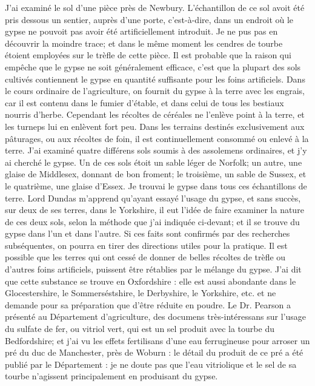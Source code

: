 \setcounter{page}{237} J'ai examiné le sol d'une pièce près de Newbury. L'échantillon de ce sol avoit été pris dessous un sentier, auprès d'une porte, c'est-à-dire, dans un endroit où le gypse ne pouvoit pas avoir été artificiellement introduit. Je ne pus pas en découvrir la moindre trace; et dans le même moment les cendres de tourbe étoient employées sur le trèfle de cette pièce. Il est probable que la raison qui empêche que le gypse ne soit généralement efficace, c'est que la plupart des sols cultivés contiennent le gypse en quantité suffisante pour les foins artificiels. Dans le cours ordinaire de l'agriculture, on fournit du gypse à la terre avec les engrais, car il est contenu dans le fumier d'étable, et dans celui de tous les bestiaux nourris d'herbe. Cependant les récoltes de céréales ne l'enlève point à la terre, et les turneps lui en enlèvent fort peu. Dans les terrains destinés exclusivement aux pâturages, ou aux récoltes de foin, il est continuellement consommé ou enlevé à la terre. J'ai examiné quatre différens sols soumis à des assolemens ordinaires, et j'y ai cherché le gypse. Un de ces sols étoit un sable léger de Norfolk; un autre, une glaise de Middlesex, donnant de bon froment; le troisième, un sable de Sussex, et le quatrième, une glaise d'Essex.\setcounter{page}{238} Je trouvai le gypse dans tous ces échantillons de terre. Lord Dundas m'apprend qu'ayant essayé l'usage du gypse, et sans succès, sur deux de ses terres, dans le Yorkshire, il eut l'idée de faire examiner la nature de ces deux sols, selon la méthode que j'ai indiquée ci-devant; et il se trouve du gypse dans l'un et dans l'autre.
Si ces faits sont confirmés par des recherches subséquentes, on pourra en tirer des directions utiles pour la pratique. Il est possible que les terres qui ont cessé de donner de belles récoltes de trèfle ou d'autres foins artificiels, puissent être rétablies par le mélange du gypse. J'ai dit que cette substance se trouve en Oxfordshire : elle est aussi abondante dans le Glocestershire, le Sommerséstshire, le Derbyshire, le Yorkshire, etc. et ne demande pour sa préparation que d'être réduite en poudre.
Le Dr. Pearson a présenté au Département d'agriculture, des documens très-intéressans sur l'usage du sulfate de fer, ou vitriol vert, qui est un sel produit avec la tourbe du Bedfordshire; et j'ai vu les effets fertilisans d'une eau ferrugineuse pour arroser un pré du duc de Manchester, près de Woburn : le détail du produit de ce pré a été publié par le Département : je ne doute pas que\setcounter{page}{239} l'eau vitriolique et le sel de sa tourbe n'agissent principalement en produisant du gypse.
